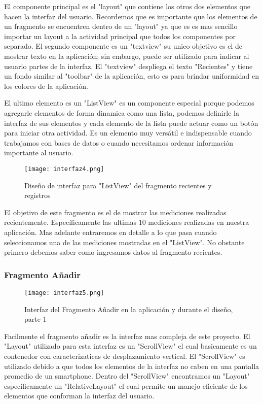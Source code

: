 \par \noindent
El componente principal es el "layout" que contiene los otros dos elementos que hacen la interfaz del usuario. Recordemos que es importante que los elementos de un fragmento se encuentren dentro de un "layout" ya que es es mas sencillo importar un layout a la actividad principal que todos los componentes por separado. El segundo componente es un "textview" su unico objetivo es el de mostrar texto en la aplicación; sin embargo, puede ser utilizado para indicar al usuario partes de la interfaz. El "textview" despliega el texto "Recientes" y tiene un fondo similar al "toolbar" de la aplicación, esto es para brindar uniformidad en los colores de la aplicación. 

\par \noindent
El ultimo elemento es un "ListView" es un componente especial porque podemos agregarle elementos de forma dinamica como una lista, podemos definirle la interfaz de sus elementos y cada elemento de la lista puede actuar como un botón para iniciar otra actividad. Es un elemento muy versátil e indispensable cuando trabajamos con bases de datos o cuando necesitamos ordenar información importante al usuario.

\begin{figure}[H]
	\centering
	\texttt{[image: interfaz4.png]}
	\caption{Diseño de interfaz para "ListView" del fragmento recientes y registros}
\end{figure}

\par \noindent
El objetivo de este fragmento es el de mostrar las mediciones realizadas recientemente. Específicamente las ultimas 10 mediciones realizadas en nuestra aplicación. Mas adelante entraremos en detalle a lo que pasa cuando seleccionamos una de las mediciones mostradas en el "ListView". No obstante primero debemos saber como ingresamos datos al fragmento recientes. 

\subsubsection{Fragmento Añadir}

\begin{figure}[H]
	\centering
	\texttt{[image: interfaz5.png]}
	\caption{Interfaz del Fragmento Añadir en la aplicación y durante el diseño, parte 1}
\end{figure}

\par 
Facilmente el fragmento añadir es la interfaz mas compleja de este proyecto. El "Layout" utilizado para esta interfaz es un "ScrollView" el cual basicamente es un contenedor con caracterizaticas de desplazamiento vertical. El "ScrollView" es utilizado debido a que todos los elementos de la interfaz no caben en una pantalla promedio de un smartphone. Dentro del "ScrollView" encontramos un "Layout" específicamente un "RelativeLayout" el cual permite un manejo eficiente de los elementos que conforman la interfaz del usuario. 

